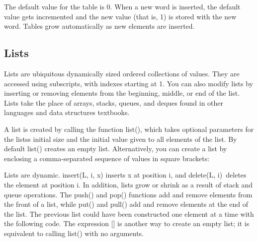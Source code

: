 
The default value for the table is 0. When a new word is inserted, the
default value gets incremented and the new value (that is, 1) is stored
with the new word. Tables grow automatically as new elements are
inserted.

\subsection[Lists]{Lists}
Lists are ubiquitous dynamically sized ordered
collections of values. They are accessed using subscripts, with indexes
starting at 1. You can also modify lists by inserting or removing
elements from the beginning, middle, or end of the list. Lists take the
place of arrays, stacks, queues,
and deques found in other languages and data structures
textbooks.

A list is created by calling the function \textsf{list()},
which takes optional parameters for the lists{\textquotesingle}s
initial size and the initial value given to all elements of the list.
By default \textsf{list()} creates an empty list. Alternatively, you
can create a list by enclosing a comma-separated sequence of values in
square brackets: 


Lists are dynamic. \textsf{insert(L, i, x)} inserts
\textsf{x} at position \textsf{i}, and
\textsf{delete(L, i)}\texttt{ }deletes the element
at position \textsf{i}. In addition, lists grow or shrink as a result
of stack and queue operations. The \textsf{push()} and
\textsf{pop()} functions add and remove elements from the
front of a list, while \textsf{put()} and
\textsf{pull()} add and remove elements at the end of
the list. The previous list could have been constructed one element at
a time with the following code. The expression \textsf{[]} is another
way to create an empty list; it is equivalent to
calling \textsf{list()} with no arguments.


